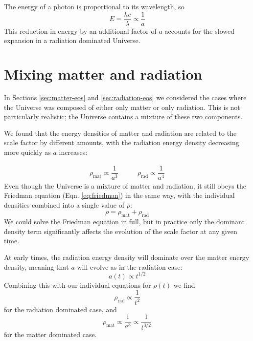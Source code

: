 \documentclass[11pt,a4paper]{book}
\begin{document}
The energy of a photon is proportional to its wavelength, so
\begin{equation}
E = \dfrac{h c}{\lambda} \propto \dfrac{1}{a}
\label{eq:lambda-a-3}
\end{equation}
This reduction in
energy by an additional factor of \(a\) accounts for the slowed expansion
in a radiation dominated Universe.

\hypertarget{sec:mixtures}{%
\section{Mixing matter and radiation}\label{sec:mixtures}}

In Sections \ref{sec:matter-eos} and
\ref{sec:radiation-eos} we considered the cases where the
Universe was composed of either only matter or only radiation. This is
not particularly realistic; the Universe contains a mixture of these two
components.

We found that the energy densities of matter and radiation are related
to the scale factor by different amounts, with the radiation energy
density decreasing more quickly as \(a\) increases:

\begin{equation}
\begin{array}{lr}
    \rho_{\text{mat}} \propto \dfrac{1}{a^3} & \qquad
    \rho_{\text{rad}} \propto \dfrac{1}{a^4}
\end{array}
\label{eq:rad-mat-1}
\end{equation}
Even though the Universe is a mixture of matter and
radiation, it still obeys the Friedman equation
(Eqn. \eqref{eq:friedman}) in the same way, with the individual
densities combined into a single value of \(\rho\):
\begin{equation}
\rho = \rho_{\text{mat}} + \rho_{\text{rad}}
\label{eq:rho-mat-rad}
\end{equation}
We could solve the
Friedman equation in full, but in practice only the dominant density term significantly affects the evolution of the scale factor at any
given time.

At early times, the radiation energy density will dominate over the
matter energy density, meaning that \(a\) will evolve as in the radiation
case:
\begin{equation}
a(t) \propto t^{1/2}
\label{eq:a-t}
\end{equation}
Combining this with our individual
equations for \(\rho(t)\) we find
\begin{equation}
\rho_{\text{rad}} \propto \dfrac{1}{t^2}
\label{eq:rho-rad-t}
\end{equation}
for the radiation dominated case, and
\begin{equation}
     \rho_{\text{mat}} \propto \dfrac{1}{a^3} \propto \dfrac{1}{t^{3/2}}
\label{eq:rho-mat-t}
\end{equation}
for the matter dominated case.
\end{document}
